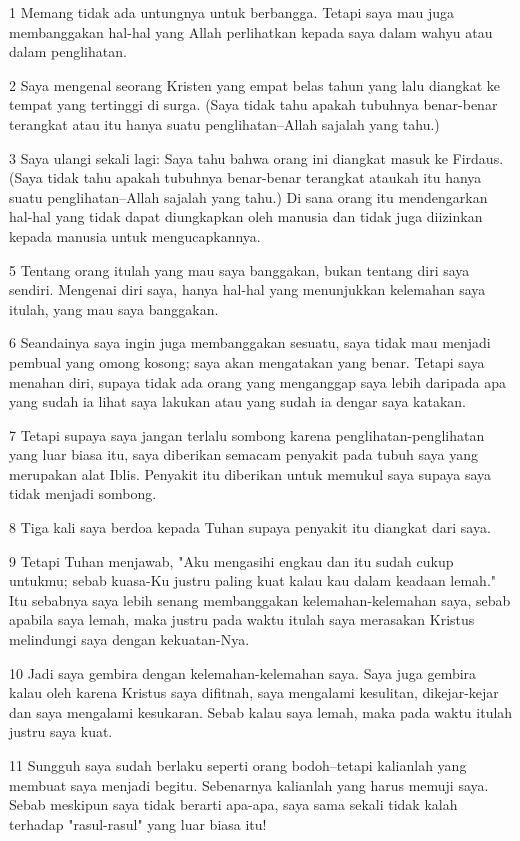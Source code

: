 \par 1 Memang tidak ada untungnya untuk berbangga. Tetapi saya mau juga membanggakan hal-hal yang Allah perlihatkan kepada saya dalam wahyu atau dalam penglihatan.
\par 2 Saya mengenal seorang Kristen yang empat belas tahun yang lalu diangkat ke tempat yang tertinggi di surga. (Saya tidak tahu apakah tubuhnya benar-benar terangkat atau itu hanya suatu penglihatan--Allah sajalah yang tahu.)
\par 3 Saya ulangi sekali lagi: Saya tahu bahwa orang ini diangkat masuk ke Firdaus. (Saya tidak tahu apakah tubuhnya benar-benar terangkat ataukah itu hanya suatu penglihatan--Allah sajalah yang tahu.) Di sana orang itu mendengarkan hal-hal yang tidak dapat diungkapkan oleh manusia dan tidak juga diizinkan kepada manusia untuk mengucapkannya.
\par 5 Tentang orang itulah yang mau saya banggakan, bukan tentang diri saya sendiri. Mengenai diri saya, hanya hal-hal yang menunjukkan kelemahan saya itulah, yang mau saya banggakan.
\par 6 Seandainya saya ingin juga membanggakan sesuatu, saya tidak mau menjadi pembual yang omong kosong; saya akan mengatakan yang benar. Tetapi saya menahan diri, supaya tidak ada orang yang menganggap saya lebih daripada apa yang sudah ia lihat saya lakukan atau yang sudah ia dengar saya katakan.
\par 7 Tetapi supaya saya jangan terlalu sombong karena penglihatan-penglihatan yang luar biasa itu, saya diberikan semacam penyakit pada tubuh saya yang merupakan alat Iblis. Penyakit itu diberikan untuk memukul saya supaya saya tidak menjadi sombong.
\par 8 Tiga kali saya berdoa kepada Tuhan supaya penyakit itu diangkat dari saya.
\par 9 Tetapi Tuhan menjawab, "Aku mengasihi engkau dan itu sudah cukup untukmu; sebab kuasa-Ku justru paling kuat kalau kau dalam keadaan lemah." Itu sebabnya saya lebih senang membanggakan kelemahan-kelemahan saya, sebab apabila saya lemah, maka justru pada waktu itulah saya merasakan Kristus melindungi saya dengan kekuatan-Nya.
\par 10 Jadi saya gembira dengan kelemahan-kelemahan saya. Saya juga gembira kalau oleh karena Kristus saya difitnah, saya mengalami kesulitan, dikejar-kejar dan saya mengalami kesukaran. Sebab kalau saya lemah, maka pada waktu itulah justru saya kuat.
\par 11 Sungguh saya sudah berlaku seperti orang bodoh--tetapi kalianlah yang membuat saya menjadi begitu. Sebenarnya kalianlah yang harus memuji saya. Sebab meskipun saya tidak berarti apa-apa, saya sama sekali tidak kalah terhadap "rasul-rasul" yang luar biasa itu!
